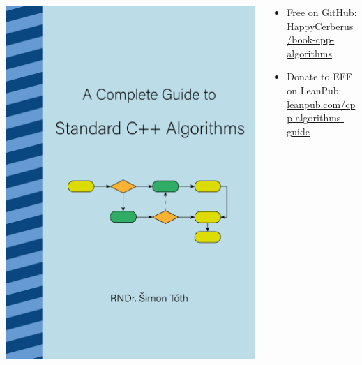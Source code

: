 \documentclass[aspectratio=169]{beamer}
\begin{document}
\begin{frame}{}
    \begin{columns}
        \begin{column}{0.35\textwidth}
            \includegraphics[height=0.8\textheight]{static/book_cover.png}
        \end{column}
        \begin{column}{0.6\textwidth}
            \begin{itemize}
                \item Free on GitHub:\\
                    \href{https://github.com/HappyCerberus/book-cpp-algorithms}{HappyCerberus/book-cpp-algorithms}
                \item Donate to EFF on LeanPub:\\
                    \href{https://leanpub.com/cpp-algorithms-guide}{leanpub.com/cpp-algorithms-guide}
            \end{itemize}
        \end{column}
    \end{columns}
\end{frame}
\end{document}
